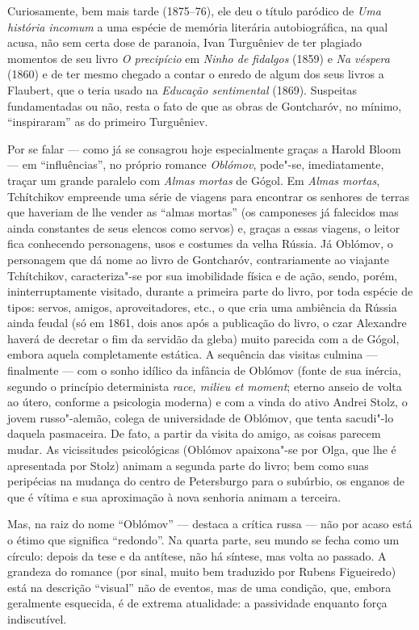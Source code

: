Curiosamente, bem mais tarde (1875--76), ele deu o título paródico de \emph{Uma história incomum} a uma espécie de memória literária autobiográfica, na qual acusa, não sem certa dose de paranoia, Ivan Turguêniev de ter plagiado momentos de seu livro \emph{O precipício} em \emph{Ninho de fidalgos} (1859) e \emph{Na véspera} (1860) e de ter mesmo chegado a contar o enredo de algum dos seus livros a Flaubert, que o teria usado na \emph{Educação sentimental} (1869). Suspeitas fundamentadas ou não, resta o fato de que as obras de Gontcharóv, no mínimo, ``inspiraram'' as do primeiro Turguêniev.

Por se falar --- como já se consagrou hoje especialmente graças a
Harold Bloom --- em ``influências'', no próprio romance
\emph{Oblómov}, pode"-se, imediatamente, traçar um grande paralelo
com \emph{Almas mortas} de Gógol. Em \emph{Almas mortas}, Tchítchikov
empreende uma série de viagens para encontrar os senhores de terras
que haveriam de lhe vender as ``almas mortas'' (os camponeses já
falecidos mas ainda constantes de seus elencos como servos) e, graças
a essas viagens, o leitor fica conhecendo personagens, usos e costumes
da velha Rússia. Já Oblómov, o personagem que dá nome ao livro de Gontcharóv,
contrariamente ao viajante Tchítchikov, caracteriza"-se por sua
imobilidade física e de ação, sendo, porém, ininterruptamente
visitado, durante a primeira parte do livro, por toda espécie
de tipos: servos, amigos, aproveitadores, etc., o que cria uma
ambiência da Rússia ainda feudal (só em 1861, dois anos após
a publicação do livro, o czar Alexandre  haverá de
decretar o fim da servidão da gleba) muito parecida com a de Gógol,
embora aquela completamente estática. A sequência das visitas culmina ---
finalmente --- com o sonho idílico da infância de Oblómov
(fonte de sua inércia, segundo o princípio determinista \emph{race,
milieu et moment}; eterno anseio de volta ao útero, conforme a
psicologia moderna) e com a vinda do ativo Andrei Stolz, o jovem
russo"-alemão, colega de universidade de Oblómov, que tenta
sacudi"-lo daquela pasmaceira. De fato, a partir da visita do
amigo, as coisas parecem mudar. As vicissitudes psicológicas
(Oblómov apaixona"-se por Olga, que lhe é apresentada por Stolz)
animam a segunda parte do livro; bem como suas peripécias na
mudança do centro de Petersburgo para o subúrbio, os enganos
de que é vítima e sua aproximação à nova senhoria animam a
terceira.

Mas, na raiz do nome ``Oblómov'' --- destaca a crítica russa --- não por acaso está o étimo que significa ``redondo''. Na quarta parte, seu mundo se fecha como um círculo: depois da tese e da antítese, não há síntese, mas volta ao passado. A grandeza do romance (por sinal, muito bem traduzido por Rubens Figueiredo) está na descrição ``visual'' não de eventos, mas de uma condição, que, embora geralmente esquecida, é de extrema atualidade: a passividade enquanto força indiscutível. 

